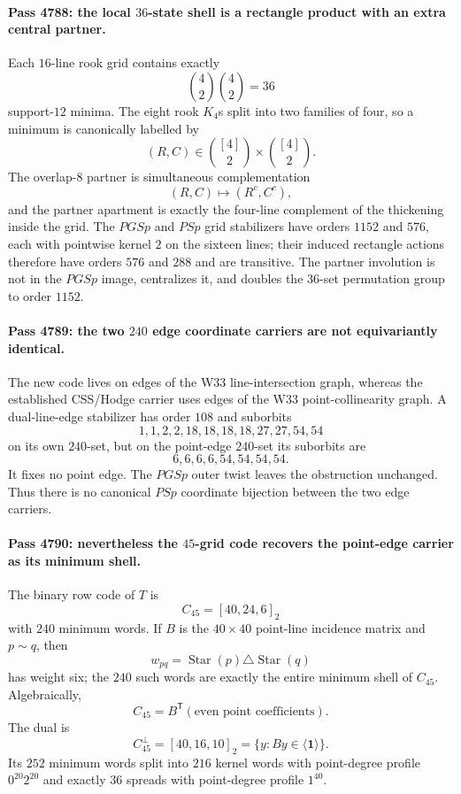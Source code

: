 \paragraph{Pass 4788: the local $36$-state shell is a rectangle product with an extra central partner.}
Each $16$-line rook grid contains exactly
\[
\binom42\binom42=36
\]
support-$12$ minima.  The eight rook $K_4$s split into two families of four, so a minimum is canonically labelled by
\[
(R,C)\in\binom{[4]}2\times\binom{[4]}2.
\]
The overlap-$8$ partner is simultaneous complementation
\[
(R,C)\mapsto(R^c,C^c),
\]
and the partner apartment is exactly the four-line complement of the thickening inside the grid.  The $PGSp$ and $PSp$ grid stabilizers have orders $1152$ and $576$, each with pointwise kernel $2$ on the sixteen lines; their induced rectangle actions therefore have orders $576$ and $288$ and are transitive.  The partner involution is not in the $PGSp$ image, centralizes it, and doubles the $36$-set permutation group to order $1152$.

\paragraph{Pass 4789: the two $240$ edge coordinate carriers are not equivariantly identical.}
The new code lives on edges of the W33 line-intersection graph, whereas the established CSS/Hodge carrier uses edges of the W33 point-collinearity graph.  A dual-line-edge stabilizer has order $108$ and suborbits
\[
1,1,2,2,18,18,18,18,27,27,54,54
\]
on its own $240$-set, but on the point-edge $240$-set its suborbits are
\[
6,6,6,6,54,54,54,54.
\]
It fixes no point edge.  The $PGSp$ outer twist leaves the obstruction unchanged.  Thus there is no canonical $PSp$ coordinate bijection between the two edge carriers.

\paragraph{Pass 4790: nevertheless the $45$-grid code recovers the point-edge carrier as its minimum shell.}
The binary row code of $T$ is
\[
\boxed{C_{45}=[40,24,6]_2}
\]
with $240$ minimum words.  If $B$ is the $40\times40$ point-line incidence matrix and $p\sim q$, then
\[
w_{pq}=\operatorname{Star}(p)\triangle\operatorname{Star}(q)
\]
has weight six; the $240$ such words are exactly the entire minimum shell of $C_{45}$.  Algebraically,
\[
C_{45}=B^{\mathsf T}(\text{even point coefficients}).
\]
The dual is
\[
\boxed{C_{45}^{\perp}=[40,16,10]_2=\{y:By\in\langle\mathbf1\rangle\}.}
\]
Its $252$ minimum words split into $216$ kernel words with point-degree profile $0^{20}2^{20}$ and exactly $36$ spreads with point-degree profile $1^{40}$.

